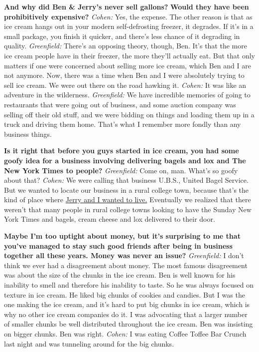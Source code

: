 \textbf{And why did Ben \& Jerry's never sell gallons?} \textbf{Would
they have been prohibitively expensive?} \emph{Cohen:} Yes, the expense.
The other reason is that as ice cream hangs out in your modern
self-defrosting freezer, it degrades. If it's in a small package, you
finish it quicker, and there's less chance of it degrading in quality.
\emph{Greenfield:} There's an opposing theory, though, Ben. It's that
the more ice cream people have in their freezer, the more they'll
actually eat. But that only matters if one were concerned about selling
more ice cream, which Ben and I are not anymore. Now, there was a time
when Ben and I were absolutely trying to sell ice cream. We were out
there on the road hawking it. \emph{Cohen:} It was like an adventure in
the wilderness. \emph{Greenfield:} We have incredible memories of going
to restaurants that were going out of business, and some auction company
was selling off their old stuff, and we were bidding on things and
loading them up in a truck and driving them home. That's what I remember
more fondly than any business things.

\textbf{Is it right that before you guys started in ice cream, you had
some goofy idea for a business involving delivering bagels and lox and
The New York Times to people?} \emph{Greenfield:} Come on, man. What's
so goofy about that? \emph{Cohen:} We were calling that business U.B.S.,
United Bagel Service. But we wanted to locate our business in a rural
college town, because that's the kind of place where
\href{http://nytimes3xbfgragh.onion\#tooltip-8}{Jerry and I wanted to
live.} Eventually we realized that there weren't that many people in
rural college towns looking to have the Sunday New York Times and
bagels, cream cheese and lox delivered to their door.

\textbf{Maybe I'm too uptight about money, but it's surprising to me
that you've managed to stay such good friends after being in business
together all these years. Money was never an issue?} \emph{Greenfield:}
I don't think we ever had a disagreement about money. The most famous
disagreement was about the size of the chunks in the ice cream. Ben is
well known for his inability to smell and therefore his inability to
taste. So he was always focused on texture in ice cream. He liked big
chunks of cookies and candies. But I was the one making the ice cream,
and it's hard to put big chunks in ice cream, which is why no other ice
cream companies do it. I was advocating that a larger number of smaller
chunks be well distributed throughout the ice cream. Ben was insisting
on bigger chunks. Ben was right. \emph{Cohen:} I was eating Coffee
Toffee Bar Crunch last night and was tunneling around for the big
chunks.

